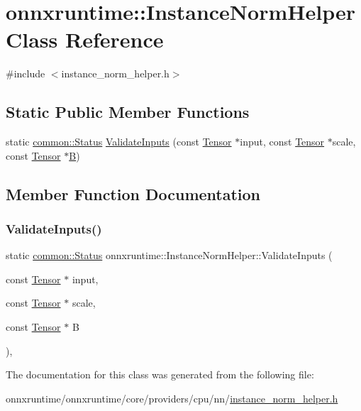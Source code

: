\hypertarget{classonnxruntime_1_1InstanceNormHelper}{}\section{onnxruntime\+:\+:Instance\+Norm\+Helper Class Reference}
\label{classonnxruntime_1_1InstanceNormHelper}


{\ttfamily \#include $<$instance\+\_\+norm\+\_\+helper.\+h$>$}

\subsection*{Static Public Member Functions}
\begin{DoxyCompactItemize}
\item 
static \mbox{\hyperlink{classonnxruntime_1_1common_1_1Status}{common\+::\+Status}} \mbox{\hyperlink{classonnxruntime_1_1InstanceNormHelper_a38a9eb3c83fec7c463077bdda976350a}{Validate\+Inputs}} (const \mbox{\hyperlink{classonnxruntime_1_1Tensor}{Tensor}} $\ast$input, const \mbox{\hyperlink{classonnxruntime_1_1Tensor}{Tensor}} $\ast$scale, const \mbox{\hyperlink{classonnxruntime_1_1Tensor}{Tensor}} $\ast$\mbox{\hyperlink{mlasi_8h_a472f4360dfbf830e5135980ff43484b9}{B}})
\end{DoxyCompactItemize}


\subsection{Member Function Documentation}
\mbox{\label{classonnxruntime_1_1InstanceNormHelper_a38a9eb3c83fec7c463077bdda976350a}} 
\subsubsection{\texorpdfstring{Validate\+Inputs()}{ValidateInputs()}}
{\footnotesize\ttfamily static \mbox{\hyperlink{classonnxruntime_1_1common_1_1Status}{common\+::\+Status}} onnxruntime\+::\+Instance\+Norm\+Helper\+::\+Validate\+Inputs (\begin{DoxyParamCaption}\item[{const \mbox{\hyperlink{classonnxruntime_1_1Tensor}{Tensor}} $\ast$}]{input,  }\item[{const \mbox{\hyperlink{classonnxruntime_1_1Tensor}{Tensor}} $\ast$}]{scale,  }\item[{const \mbox{\hyperlink{classonnxruntime_1_1Tensor}{Tensor}} $\ast$}]{B }\end{DoxyParamCaption})\hspace{0.3cm}{\ttfamily [inline]}, {\ttfamily [static]}}



The documentation for this class was generated from the following file\+:\begin{DoxyCompactItemize}
\item 
onnxruntime/onnxruntime/core/providers/cpu/nn/\mbox{\hyperlink{instance__norm__helper_8h}{instance\+\_\+norm\+\_\+helper.\+h}}\end{DoxyCompactItemize}
